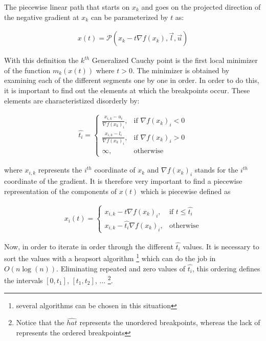 The piecewise linear path that starts on $x_k$ and goes on the projected direction of the negative gradient at $x_k$ can be parameterized by $t$ as:

\begin{equation}
  \begin{aligned}
    x(t) = \mathcal{P}(x_k - t \nabla f(x_k), \vec{l}, \vec{u})
  \end{aligned}
\end{equation}

With this definition the $k^{th}$ Generalized Cauchy point is the first local minimizer of the function $m_k(x(t))$ where $t > 0$.  The minimizer is obtained by examining each of the different segments one by one in order.  In order to do this, it is important to find out the elements at which the breakpoints occur.  These elements are characteristized disorderly by:

\begin{equation} 
  \begin{aligned} \label{findingt}
    \hat{t_i} = 
    \begin{cases}
      \frac{x_{i,k} - u_i}{\nabla f(x_k)_i}, & \text{if } \nabla f(x_k)_i < 0 \\
      \frac{x_{i,k} - l_i}{\nabla f(x_k)_i}, & \text{if } \nabla f(x_k)_i > 0 \\
      \infty, & \text{otherwise}
    \end{cases}
  \end{aligned}
\end{equation}

where $x_{i,k}$ represents the $i^{th}$ coordinate of $x_k$ and $\nabla f(x_k)_i$ stands for the $i^{th}$ coordinate of the gradient.  It is therefore very important to find a piecewise representation of the components of $x(t)$ which is piecewise defined as

\begin{equation}
  \begin{aligned}
    x_i(t) = 
    \begin{cases}
      x_{i,k} - t \nabla f(x_k)_i, & \text{if } t \leq \hat{t_i} \\
      x_{i,k} - \hat{t_i} \nabla f(x_k)_i, & \text{otherwise}
    \end{cases}
  \end{aligned}
\end{equation}

Now, in order to iterate in order through the different $\hat{t_i}$ values.  It is necessary to sort the values with a heapsort algorithm \footnote{several algorithms can be chosen in this situation} which can do the job in $O(n \log{(n)})$.  Eliminating repeated and zero values of $\hat{t_i}$, this ordering defines the intervals $[0, t_1]$, $[t_1, t_2]$, $\ldots$ \footnote{Notice that the $\hat{hat}$ represents the unordered breakpoints, whereas the lack of represents the ordered breakpoints}.

